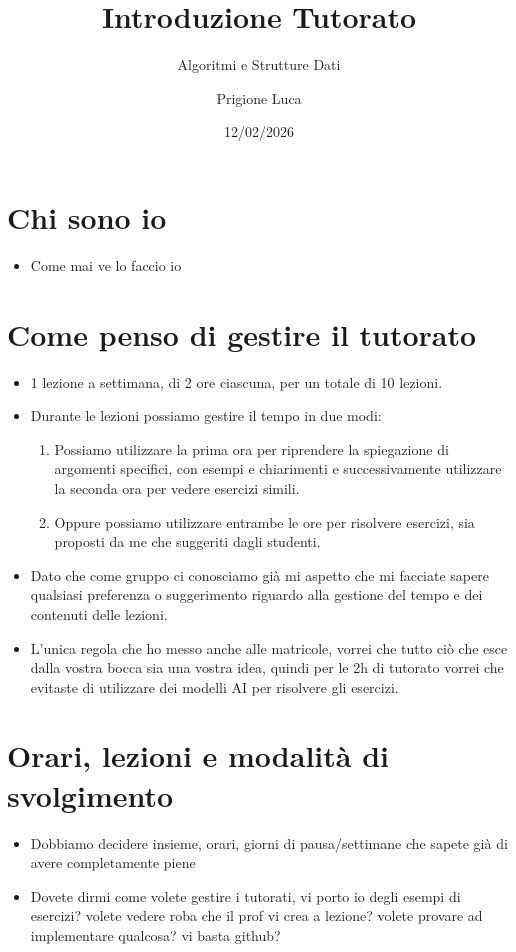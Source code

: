 \documentclass[a4paper]{article}
\title{Introduzione Tutorato}
\subtitle{Algoritmi e Strutture Dati}
\author{Prigione Luca}
\date{12/02/2026}
\begin{document}
\pagestyle{empty}

\maketitle

\section*{Chi sono io}
  \begin{itemize}
    \item Come mai ve lo faccio io
  \end{itemize}

\section*{Come penso di gestire il tutorato}
  \begin{itemize}
    \item 1 lezione a settimana, di 2 ore ciascuna, per un totale di 10 lezioni.
    \item Durante le lezioni possiamo gestire il tempo in due modi:
      \begin{enumerate}
        \item Possiamo utilizzare la prima ora per riprendere la spiegazione di argomenti specifici, con esempi e chiarimenti e successivamente utilizzare la seconda ora per vedere esercizi simili.
        \item Oppure possiamo utilizzare entrambe le ore per risolvere esercizi, sia proposti da me che suggeriti dagli studenti.
      \end{enumerate}
    \item Dato che come gruppo ci conosciamo già mi aspetto che mi facciate sapere qualsiasi preferenza o suggerimento riguardo alla gestione del tempo e dei contenuti delle lezioni.
    \item L'unica regola che ho messo anche alle matricole, vorrei che tutto ciò che esce dalla vostra bocca sia una vostra idea, quindi per le 2h di tutorato vorrei che evitaste di utilizzare dei modelli AI per risolvere gli esercizi.
  \end{itemize}

\section*{Orari, lezioni e modalità di svolgimento}
  \begin{itemize}
    \item Dobbiamo decidere insieme, orari, giorni di pausa/settimane che sapete già di avere completamente piene
    \item Dovete dirmi come volete gestire i tutorati, vi porto io degli esempi di esercizi? volete vedere roba che il prof vi crea a lezione? volete provare ad implementare qualcosa? vi basta github?
  \end{itemize}
\end{document}
